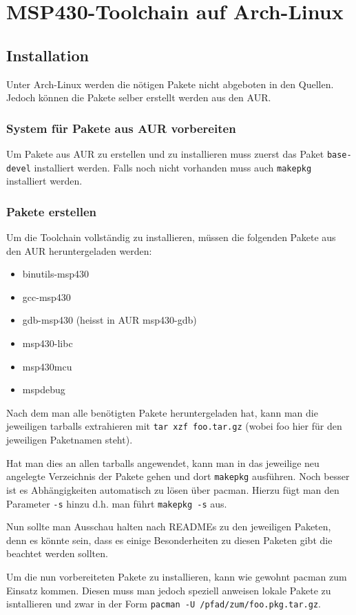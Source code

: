 \section{MSP430-Toolchain auf Arch-Linux}
\subsection{Installation}
Unter Arch-Linux werden die nötigen Pakete nicht abgeboten in den Quellen.
Jedoch können die Pakete selber erstellt werden aus den AUR.

\subsubsection{System für Pakete aus AUR vorbereiten}
Um Pakete aus AUR zu erstellen und zu installieren muss zuerst das Paket
\verb!base-devel! installiert werden. Falls noch nicht vorhanden muss auch
\verb!makepkg! installiert werden.

\subsubsection{Pakete erstellen}
Um die Toolchain vollständig zu installieren, müssen die folgenden Pakete aus
den AUR heruntergeladen werden:
\begin{itemize}
	\item binutils-msp430
	\item gcc-msp430
	\item gdb-msp430 (heisst in AUR msp430-gdb)
	\item msp430-libc
	\item msp430mcu
	\item mspdebug
\end{itemize}
Nach dem man alle benötigten Pakete heruntergeladen hat, kann man die 
jeweiligen tarballs extrahieren mit \verb!tar xzf foo.tar.gz! (wobei foo
hier für den jeweiligen Paketnamen steht).

Hat man dies an allen tarballs angewendet, kann man in das jeweilige neu
angelegte Verzeichnis der Pakete gehen und dort \verb!makepkg! ausführen.
Noch besser ist es Abhängigkeiten automatisch zu lösen über pacman. Hierzu
fügt man den Parameter \verb!-s! hinzu d.h. man führt \verb!makepkg -s! aus.

Nun sollte man Ausschau halten nach READMEs zu den jeweiligen Paketen, denn
es könnte sein, dass es einige Besonderheiten zu diesen Paketen gibt die
beachtet werden sollten. 

Um die nun vorbereiteten Pakete zu installieren, kann wie gewohnt pacman zum
Einsatz kommen. Diesen muss man jedoch speziell anweisen lokale Pakete zu
isntallieren und zwar in der Form \verb!pacman -U /pfad/zum/foo.pkg.tar.gz!.

